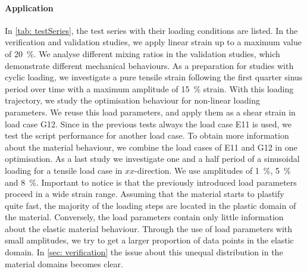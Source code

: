 \paragraph{Application}
In \autoref{tab: testSeries}, the test series with their loading conditions are listed.
In the verification and validation studies, we apply linear strain up to a maximum value of 20 \%.
We analyse different mixing ratios in the validation studies, which demonstrate different mechanical behaviours.
As a preparation for studies with cyclic loading, we investigate a pure tensile strain following the first quarter sinus period over time with a maximum amplitude of 15 \% strain. With this loading trajectory, we study the optimisation behaviour for non-linear loading parameters.
We reuse this load parameters, and apply them as a shear strain in load case G12. Since in the previous tests always the load case E11 is used, we test the script performance for another load case.
To obtain more information about the material behaviour, we combine the load cases of E11 and G12 in one optimisation. 
As a last study we investigate one and a half period of a sinusoidal loading for a tensile load case in $xx$-direction. We use amplitudes of 1 \%, 5 \% and 8 \%. Important to notice is that the previously introduced load parameters proceed in a wide strain range. Assuming that the material starts to plastify quite fast, the majority of the loading steps are located in the plastic domain of the material. Conversely, the load parameters contain only little information about the elastic material behaviour. 
Through the use of load parameters with small amplitudes, we try to get a larger proportion of data points in the elastic domain.
In \autoref{sec: verification} the issue about this unequal distribution in the material domains becomes clear.    

